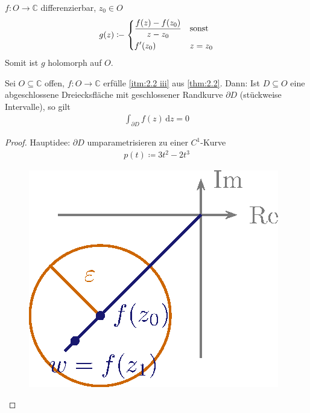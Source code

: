 \documentclass[a4paper,10pt]{scrbook}
\begin{document}
\begin{example}
  $f : O \to \mathbb{C}$ differenzierbar, $z_0 \in O$
  \begin{align*}
    g(z) \coloneq
    \begin{dcases}
      \frac{f(z) - f(z_0)}{z - z_0} & \text{sonst} \\
      f'(z_0) & z = z_0
    \end{dcases}
  \end{align*}
  Somit ist $g$ holomorph auf $O$.
\end{example}

\begin{theorem}[Hilfssatz]\label{thm:2.17}
  Sei $O \subseteq \mathbb{C}$ offen, $f:O \to \mathbb{C}$ erfülle \ref{itm:2.2 iii} aus \ref{thm:2.2}. Dann: Ist $D \subseteq O$ eine abgeschlossene Dreiecksfläche mit geschlossener Randkurve $\partial D$ (stückweise Intervalle), so gilt
  \begin{align*}
    \int_{\partial D} f(z) \, \mathrm{d}z = 0
  \end{align*}

  \begin{proof}
    Hauptidee: $\partial D$ umparametrisieren zu einer $C^1$-Kurve
    \begin{align*}
      p(t) \coloneq 3 t^2 - 2 t^3
    \end{align*}

    \begin{figure}[H]
      \centering
      \includegraphics[scale=0.2]{images/ana3-tmp-19}
    \end{figure}


\end{proof}
\end{theorem}
\end{document}
